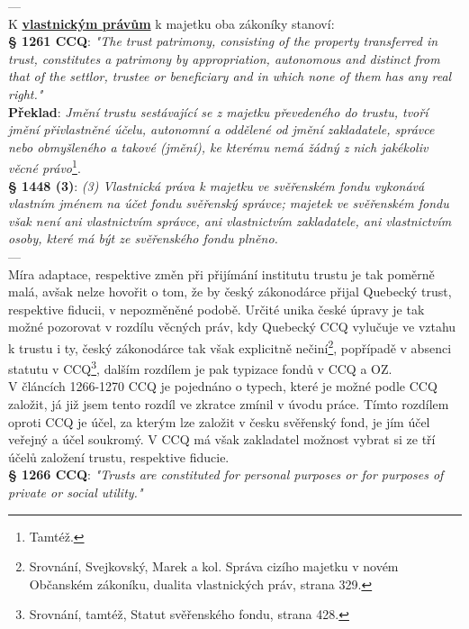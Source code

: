 \documentclass{article}
\begin{document}
---\\

K \textbf{\underline{vlastnickým právům}} k majetku oba zákoníky stanoví:\\

\textbf{§ 1261 CCQ}: \textit{"The trust patrimony, consisting of the property transferred in trust, constitutes a patrimony by appropriation, autonomous and distinct from that of the settlor, trustee or beneficiary and in which none of them has any real right."}\\

\textbf{Překlad}: \textit{Jmění trustu sestávající se z majetku převedeného do trustu, tvoří jmění přivlastněné účelu, autonomní a oddělené od jmění zakladatele, správce nebo obmyšleného a takové (jmění), ke kterému nemá žádný z nich jakékoliv věcné právo}\footnote{Tamtéž.}.\\

\textbf{§ 1448 (3)}:
\textit{(3) Vlastnická práva k majetku ve svěřenském fondu vykonává vlastním jménem na účet fondu svěřenský správce; majetek ve svěřenském fondu však není ani vlastnictvím správce, ani vlastnictvím zakladatele, ani vlastnictvím osoby, které má být ze svěřenského fondu plněno.} \\

---\\

Míra adaptace, respektive změn při přijímání institutu trustu je tak poměrně malá, avšak nelze hovořit o tom, že by český zákonodárce přijal Quebecký trust, respektive fiducii, v nepozměněné podobě. Určité unika české úpravy je tak možné pozorovat v rozdílu věcných práv, kdy Quebecký CCQ vylučuje ve vztahu k trustu i ty, český zákonodárce tak však explicitně nečiní\footnote{Srovnání, Svejkovský, Marek a kol. Správa cizího majetku v novém Občanském zákoníku, dualita vlastnických práv, strana 329.}, popřípadě v absenci statutu v CCQ\footnote{Srovnání, tamtéž, Statut svěřenského fondu, strana 428.}, dalším rozdílem je pak typizace fondů v CCQ a OZ.\\

V článcích 1266-1270 CCQ je pojednáno o typech, které je možné podle CCQ založit, já již jsem tento rozdíl ve zkratce zmínil v úvodu práce. Tímto rozdílem oproti CCQ je účel, za kterým lze založit v česku svěřenský fond, je jím účel veřejný a účel soukromý. V CCQ má však zakladatel možnost vybrat si ze tří účelů založení trustu, respektive fiducie.\\

\textbf{§ 1266 CCQ}: \textit{"Trusts are constituted for personal purposes or for purposes of private or social utility."}\\
\end{document}
